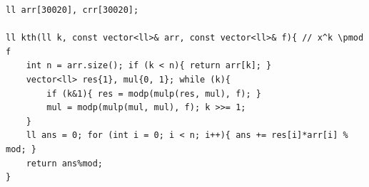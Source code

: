\begin{verbatim}
ll arr[30020], crr[30020];

ll kth(ll k, const vector<ll>& arr, const vector<ll>& f){ // x^k \pmod f
	int n = arr.size(); if (k < n){ return arr[k]; }
	vector<ll> res{1}, mul{0, 1}; while (k){
		if (k&1){ res = modp(mulp(res, mul), f); }
		mul = modp(mulp(mul, mul), f); k >>= 1;
	}
	ll ans = 0; for (int i = 0; i < n; i++){ ans += res[i]*arr[i] % mod; }
	return ans%mod;
}
\end{verbatim}